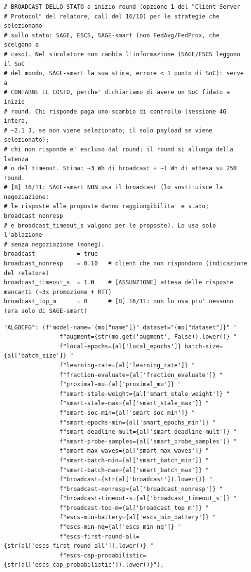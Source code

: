 \documentclass[11pt,a4paper]{article}
\begin{document}
\begin{lstlisting}[style=toml,firstnumber=290,caption={\texttt{tesifl/experiment.toml}, lines 290--350}]
# BROADCAST DELLO STATO a inizio round (opzione 1 del "Client Server
# Protocol" del relatore, call del 16/10) per le strategie che selezionano
# sullo stato: SAGE, ESCS, SAGE-smart (non FedAvg/FedProx, che scelgono a
# caso). Nel simulatore non cambia l'informazione (SAGE/ESCS leggono il SoC
# del mondo, SAGE-smart la sua stima, errore < 1 punto di SoC): serve a
# CONTARNE IL COSTO, perche' dichiariamo di avere un SoC fidato a inizio
# round. Chi risponde paga uno scambio di controllo (sessione 4G intera,
# ~2.1 J, se non viene selezionato; il solo payload se viene selezionato);
# chi non risponde e' escluso dal round; il round si allunga della latenza
# o del timeout. Stima: ~3 Wh di broadcast + ~1 Wh di attesa su 250 round.
# [B] 16/11: SAGE-smart NON usa il broadcast (lo sostituisce la negoziazione:
# le risposte alle proposte danno raggiungibilita' e stato; broadcast_nonresp
# e broadcast_timeout_s valgono per le proposte). Lo usa solo l'ablazione
# senza negoziazione (noneg).
broadcast            = true
broadcast_nonresp    = 0.10   # client che non rispondono (indicazione del relatore)
broadcast_timeout_s  = 1.0    # [ASSUNZIONE] attesa delle risposte mancanti (~3x promozione + RTT)
broadcast_top_m      = 0      # [B] 16/11: non lo usa piu' nessuno (era solo di SAGE-smart)
\end{lstlisting}

\begin{lstlisting}[style=sh,firstnumber=73,caption={\texttt{tesifl/run.sh}, lines 73--95}]
        "ALGOCFG": (f'model-name="{mo["name"]}" dataset="{mo["dataset"]}" '
                f"augment={str(mo.get('augment', False)).lower()} "
                f"local-epochs={al['local_epochs']} batch-size={al['batch_size']} "
                f"learning-rate={al['learning_rate']} "
                f"fraction-evaluate={al['fraction_evaluate']} "
                f"proximal-mu={al['proximal_mu']} "
                f"smart-stale-weight={al['smart_stale_weight']} "
                f"smart-stale-max={al['smart_stale_max']} "
                f"smart-soc-min={al['smart_soc_min']} "
                f"smart-epochs-min={al['smart_epochs_min']} "
                f"smart-deadline-mult={al['smart_deadline_mult']} "
                f"smart-probe-samples={al['smart_probe_samples']} "
                f"smart-max-waves={al['smart_max_waves']} "
                f"smart-batch-min={al['smart_batch_min']} "
                f"smart-batch-max={al['smart_batch_max']} "
                f"broadcast={str(al['broadcast']).lower()} "
                f"broadcast-nonresp={al['broadcast_nonresp']} "
                f"broadcast-timeout-s={al['broadcast_timeout_s']} "
                f"broadcast-top-m={al['broadcast_top_m']} "
                f"escs-min-battery={al['escs_min_battery']} "
                f"escs-min-nq={al['escs_min_nq']} "
                f"escs-first-round-all={str(al['escs_first_round_all']).lower()} "
                f"escs-cap-probabilistic={str(al['escs_cap_probabilistic']).lower()}"),
\end{lstlisting}
\end{document}
